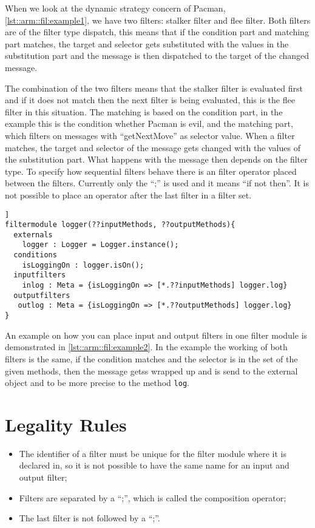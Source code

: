 When we look at the dynamic strategy concern of Pacman, \autoref{lst::arm::fil:example1}, we have two filters: stalker filter and flee filter. Both filters are of the filter type dispatch, this
means that if the condition part and matching part matches, the target and selector gets substituted with the values in the substitution part and the message is then dispatched to the target of the changed message.

The combination of the two filters means that the stalker filter is evaluated first and if it does not match then the next filter is being evaluated, this is the flee filter in this situation.
The matching is based on the condition part, in the example this is the condition whether Pacman is evil,
and the matching part, which filters on messages with ``getNextMove'' as selector value.
When a filter matches, the target and selector of the message gets changed with the values of the substitution part. What happens with the message then depends on the filter type.
To specify how sequential filters behave there is an filter operator placed between the filters. Currently only the ``;'' is used and it means ``if not then''.  It is not possible to place an operator after the last filter in a filter set.

\begin{lstlisting}[caption = {Custom logging filter module}, label=lst::arm::fil:example2,style = listing, language = ComposeStar,float=[tpb]]
filtermodule logger(??inputMethods, ??outputMethods){
  externals
    logger : Logger = Logger.instance();
  conditions
    isLoggingOn : logger.isOn();
  inputfilters
    inlog : Meta = {isLoggingOn => [*.??inputMethods] logger.log}
  outputfilters
   outlog : Meta = {isLoggingOn => [*.??outputMethods] logger.log}
}
\end{lstlisting}

An example on how you can place input and output filters in one filter module is demonstrated in \autoref{lst::arm::fil:example2}. In the example the working of both filters is the same, if the condition
matches and the selector is in the set of the given methods, then the message getss wrapped up and is send to the external object and to be more precise to the method \lstinline|log|.

\section*{Legality Rules}
\begin{itemize}[noitemsep]
\item The identifier of a filter must be unique for the filter module where it is declared in, so it is not possible to have the same name for an input and output filter;
\item Filters are separated by a ``;'', which is called the composition operator;
\item The last filter is not followed by a ``;''.
\end{itemize}

